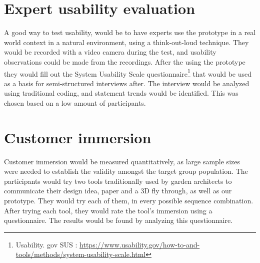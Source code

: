 \section{Expert usability evaluation}
A good way to test usability, would be to have experts use the prototype in a real world context in a natural environment, using a think-out-loud technique. They would be recorded with a video camera during the test, and usability observations could be made from the recordings. After the using the prototype they would fill out the System Usability Scale questionnaire\footnote{Usability. gov SUS : \url{https://www.usability.gov/how-to-and-tools/methods/system-usability-scale.html}} that would be used as a basis for semi-structured interviews after. The interview would be analyzed using traditional coding, and statement trends would be identified. This was chosen based on a low amount of participants.

\section{Customer immersion}
Customer immersion would be measured quantitatively, as large sample sizes were needed to establish the validity amongst the target group population. The participants would try two tools traditionally used by garden architects to communicate their design idea, paper and a 3D fly through, as well as our prototype. They would try each of them, in every possible sequence combination. After trying each tool, they would rate the tool's immersion using a questionnaire. The results would be found by analyzing this questionnaire.
